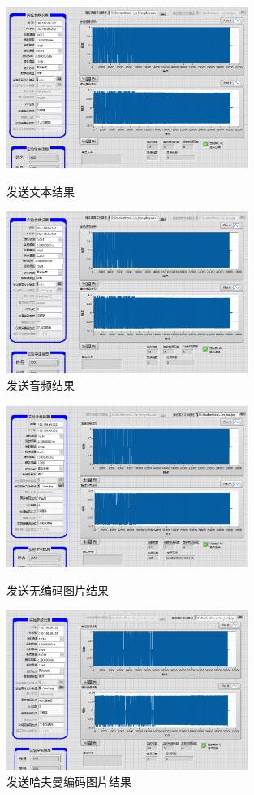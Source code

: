 \documentclass[UTF8]{ctexart}
\begin{document}
\begin{figure}[H]
    \centering
    \includegraphics[width=0.7\textwidth]{pics/74Hcrc8_text.png}
    \caption{发送文本结果}
    \includegraphics[width=0.7\textwidth]{pics/74Hcrc8_video.png}
    \caption{发送音频结果}

\end{figure}

\begin{figure}[H]
    \centering
    \includegraphics[width=0.7\textwidth]{pics/74Hcrc8_pics.png}
    \caption{发送无编码图片结果}
    \includegraphics[width=0.7\textwidth]{pics/74Hcrc8_pichuffman.png}
    \caption{发送哈夫曼编码图片结果}

\end{figure}
\end{document}
